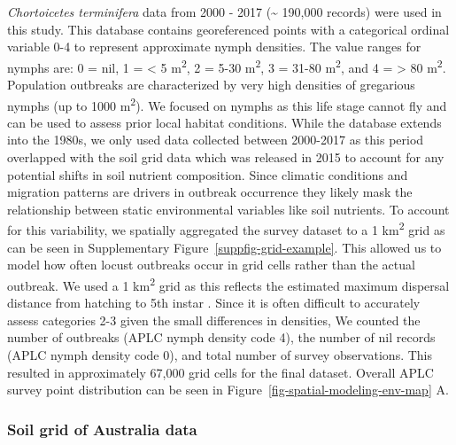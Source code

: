 \documentclass[
]{article}
\begin{document}
\emph{Chortoicetes terminifera} data from 2000 - 2017 (\textasciitilde{}
190,000 records) were used in this study. This database contains
georeferenced points with a categorical ordinal variable 0-4 to
represent approximate nymph densities. The value ranges for nymphs are:
0 = nil, 1 = \textless{} 5 m\textsuperscript{2}, 2 = 5-30
m\textsuperscript{2}, 3 = 31-80 m\textsuperscript{2}, and 4 =
\textgreater{} 80 m\textsuperscript{2}. Population outbreaks are
characterized by very high densities of gregarious nymphs (up to 1000
m\textsuperscript{2}). We focused on nymphs as this life stage cannot
fly and can be used to assess prior local habitat conditions. While the
database extends into the 1980s, we only used data collected between
2000-2017 as this period overlapped with the soil grid data which was
released in 2015 to account for any potential shifts in soil nutrient
composition. Since climatic conditions and migration patterns are
drivers in outbreak occurrence
\citep{lawton_seeing_2022, veran_modeling_2015} they likely mask the
relationship between static environmental variables like soil nutrients.
To account for this variability, we spatially aggregated the survey
dataset to a 1 km\textsuperscript{2} grid as can be seen in
Supplementary Figure~\ref{suppfig-grid-example}. This allowed us to
model how often locust outbreaks occur in grid cells rather than the
actual outbreak. We used a 1 km\textsuperscript{2} grid as this reflects
the estimated maximum dispersal distance from hatching to 5th instar
\citep{hunter_aerial_2008}. Since it is often difficult to accurately
assess categories 2-3 given the small differences in densities, We
counted the number of outbreaks (APLC nymph density code 4), the number
of nil records (APLC nymph density code 0), and total number of survey
observations. This resulted in approximately 67,000 grid cells for the
final dataset. Overall APLC survey point distribution can be seen in
Figure~\ref{fig-spatial-modeling-env-map} A.

\subsubsection{Soil grid of Australia
data}\label{soil-grid-of-australia-data}
\end{document}
